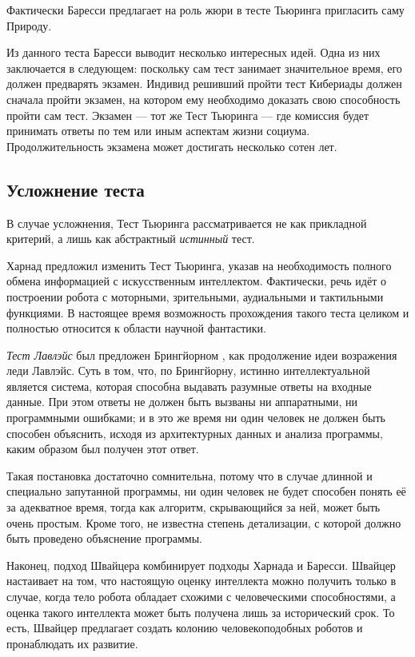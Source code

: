 \documentclass[a4paper,14pt]{scrartcl}
\begin{document}
Фактически Баресси предлагает на роль жюри в тесте Тьюринга пригласить саму Природу.

Из данного теста Баресси выводит несколько интересных идей. Одна из них заключается в следующем: поскольку сам тест занимает значительное время, его должен предварять экзамен. Индивид решивший пройти тест Кибериады должен сначала пройти экзамен, на котором ему необходимо доказать свою способность пройти сам тест. Экзамен --- тот же Тест Тьюринга --- где комиссия будет принимать ответы по тем или иным аспектам жизни социума. Продолжительность экзамена может достигать несколько сотен лет.

\subsection{Усложнение теста}

В случае усложнения, Тест Тьюринга рассматривается не как прикладной критерий, а лишь как абстрактный {\it истинный} тест.

Харнад \cite{harnand_1991} предложил изменить Тест Тьюринга, указав на необходимость полного обмена информацией с искусственным интеллектом. Фактически, речь идёт о построении робота с моторными, зрительными, аудиальными и тактильными функциями. В настоящее время возможность прохождения такого теста целиком и полностью относится к области научной фантастики.

{\it Тест Лавлэйс} был предложен Брингйорном \cite{bringsjord_1992}, как продолжение идеи возражения леди Лавлэйс. Суть в том, что, по Брингйорну, истинно интеллектуальной является система, которая способна выдавать разумные ответы на входные данные. При этом ответы не должен быть вызваны ни аппаратными, ни программными ошибками; и в это же время ни один человек не должен быть способен объяснить, исходя из архитектурных данных и анализа программы, каким образом был получен этот ответ.

Такая постановка достаточно сомнительна, потому что в случае длинной и специально запутанной программы, ни один человек не будет способен понять её за адекватное время, тогда как алгоритм, скрывающийся за ней, может быть очень простым. Кроме того, не известна степень детализации, с которой должно быть проведено объяснение программы.

Наконец, подход Швайцера комбинирует подходы Харнада и Баресси. Швайцер настаивает на том, что настоящую оценку интеллекта можно получить только в случае, когда тело робота обладает схожими с человеческими способностями, а оценка такого интеллекта может быть получена лишь за исторический срок. То есть, Швайцер предлагает создать колонию человекоподобных роботов и пронаблюдать их развитие.
\end{document}
